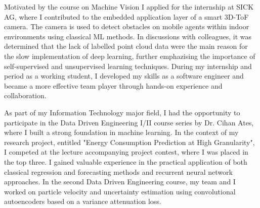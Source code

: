     Motivated by the course on Machine Vision I applied for the internship at SICK AG, where I contributed to the embedded application layer of a smart 3D-ToF camera. The camera is used to detect obstacles on mobile agents within indoor environments using classical ML methods. In discussions with colleagues, it was determined that the lack of labelled point cloud data were the main reason for the slow implementation of deep learning, further emphazising the importance of self-supervised and unsupervised learning techniques. During my internship and period as a working student, I developed my skills as a software engineer and became a more effective team player through hands-on experience and collaboration.

    As part of my Information Technology major field, I had the opportunity to participate in the Data Driven Engineering I/II course series by Dr. Cihan Ates, where I built a strong foundation in machine learning. In the context of my research project, entitled "Energy Consumption Prediction at High Granularity", I competed at the lecture accompanying project contest, where I was placed in the top three. I gained valuable experience in the practical application of  both classical regression and forecasting methods and recurrent neural network approaches. In the second Data Driven Engineering course, my team and I worked on particle velocity and uncertainty estimation using convolutional autoencoders based on a variance attenuation loss. 


